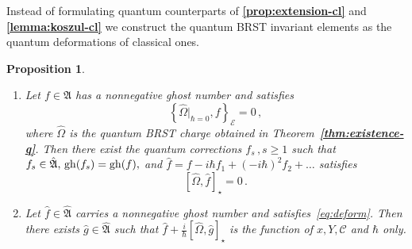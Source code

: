 \documentclass[a4paper,11pt]{amsart}
\newtheorem{prop}[thm]{Proposition}
\numberwithin{thm}{section} %
\numberwithin{equation}{section} %
\numberwithin{figure}{section} %
\newcommand{\bref}[1]{{\bf \ref{#1}}}
\def\ih{-i\hbar}
\newcommand{\qcommut}[2]{[#1,#2]_\star}
\newcommand{\pb}[2]{\left\{{}#1{},{}#2{}\right\}}
\newcommand{\gh}[1]{{\rm gh}(#1)}
\renewcommand{\:}{{\rm\, :\,}}
\def\cc{{\mathcal C}}
\def\aA{{ \mathfrak A}}
\def\qA{{\hat{\mathfrak A}}}
\def\E{{ \mathcal E}}
\begin{document}
Instead of formulating quantum counterparts of
\bref{prop:extension-cl} and \bref{lemma:koszul-cl}
we construct the quantum BRST invariant elements as the quantum
deformations of classical ones.
\begin{prop}\label{prop:hbar-extension}
\begin{enumerate}
\item
Let $f\in\aA$ has a nonnegative ghost number
and satisfies
\begin{equation}
  \pb{{\hat\Omega}\bigr|_{\hbar=0}}{f}_\E=0\,,
\end{equation}
where $\hat\Omega$ is the quantum BRST charge obtained in
Theorem~\bref{thm:existence-q}.  Then there exist the quantum
corrections $f_s\,,s\geq 1$ such that $f_s\in \qA,\, \gh{f_s}=\gh{f},$
and ${\hat f}=f\ih f_1+(\ih)^2 f_2+\ldots$ satisfies
\begin{equation}
\label{eq:deform}
  \qcommut{\hat\Omega}{\hat f}=0\,.
\end{equation}
\item
Let $\hat f\in \qA$ carries a nonnegative ghost number
and satisfies~\eqref{eq:deform}. Then there exists $\hat g \in \qA$
such that ${\hat f}+\frac{i}{\hbar}\qcommut{\hat\Omega}{\hat g}$ is
the function of $x,Y,\cc$ and $\hbar$ only.
\end{enumerate}
\end{prop}
\end{document}
